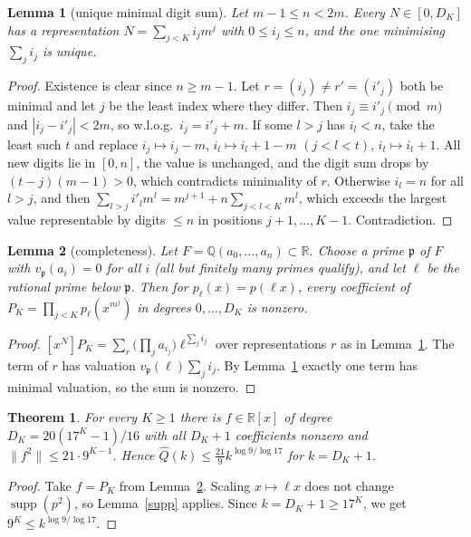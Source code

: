 \documentclass[11pt]{article}
\newtheorem{theorem}{Theorem}
\newtheorem{lemma}{Lemma}
\theoremstyle{remark}\newtheorem*{remark}{Remark}
\newcommand{\supp}{\operatorname{supp}}
\begin{document}
\begin{lemma}[unique minimal digit sum]\label{uniq}
Let $m-1\le n<2m$. Every $N\in[0,D_K]$ has a representation $N=\sum_{j<K}i_jm^j$ with $0\le i_j\le n$, and the one minimising $\sum_j i_j$ is unique.
\end{lemma}
\begin{proof}Existence is clear since $n\ge m-1$. Let $r=(i_j)\neq r'=(i'_j)$ both be minimal and let $j$ be the least index where they differ. Then $i_j\equiv i'_j\pmod m$ and $|i_j-i'_j|<2m$, so w.l.o.g.\ $i_j=i'_j+m$. If some $l>j$ has $i_l<n$, take the least such $t$ and replace $i_j\mapsto i_j-m$, $i_l\mapsto i_l+1-m$ $(j<l<t)$, $i_t\mapsto i_t+1$. All new digits lie in $[0,n]$, the value is unchanged, and the digit sum drops by $(t-j)(m-1)>0$, which contradicts minimality of $r$. Otherwise $i_l=n$ for all $l>j$, and then $\sum_{l>j}i'_lm^l=m^{j+1}+n\sum_{j<l<K}m^l$, which exceeds the largest value representable by digits $\le n$ in positions $j+1,\dots,K-1$. Contradiction.\end{proof}

\begin{lemma}[completeness]\label{dense}
Let $F=\mathbb Q(a_0,\dots,a_n)\subset\mathbb R$. Choose a prime $\mathfrak p$ of $F$ with $v_{\mathfrak p}(a_i)=0$ for all $i$ (all but finitely many primes qualify), and let $\ell$ be the rational prime below $\mathfrak p$. Then for $p_\ell(x)=p(\ell x)$, every coefficient of $P_K=\prod_{j<K}p_\ell(x^{m^j})$ in degrees $0,\dots,D_K$ is nonzero.
\end{lemma}
\begin{proof}$[x^N]P_K=\sum_r\bigl(\prod_j a_{i_j}\bigr)\ell^{\sum_j i_j}$ over representations $r$ as in Lemma~\ref{uniq}. The term of $r$ has valuation $v_{\mathfrak p}(\ell)\sum_ji_j$. By Lemma~\ref{uniq} exactly one term has minimal valuation, so the sum is nonzero.\end{proof}

\begin{theorem}
For every $K\ge1$ there is $f\in\mathbb R[x]$ of degree $D_K=20(17^K-1)/16$ with all $D_K+1$ coefficients nonzero and $\|f^2\|\le 21\cdot9^{K-1}$. Hence $\hat Q(k)\le\frac{21}{9}k^{\log9/\log17}$ for $k=D_K+1$.
\end{theorem}
\begin{proof}Take $f=P_K$ from Lemma~\ref{dense}. Scaling $x\mapsto\ell x$ does not change $\supp(p^2)$, so Lemma~\ref{supp} applies. Since $k=D_K+1\ge17^K$, we get $9^K\le k^{\log 9/\log 17}$.\end{proof}
\end{document}
